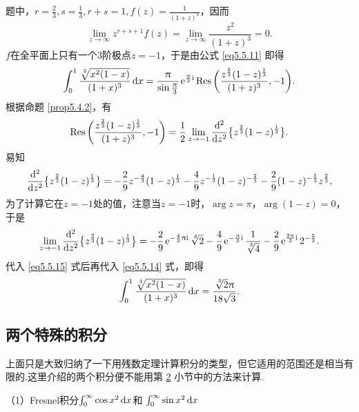 \begin{solution}
题中，$r=\frac23,s=\frac13,r+s=1,f(z)=\frac1{(1+z)^3}$，因而
\[\lim_{z\to\infty}z^{r+s+1}f(z)=\lim_{z\to\infty}\frac{z^2}{(1+z)^3}=0.\]
$f$在全平面上只有一个$3$阶极点$z=-1$，于是由公式 \eqref{eq5.5.11} 即得
\begin{equation}\label{eq5.5.14}
\int_0^1\frac{\sqrt[\leftroot{-1}\uproot{2}3]{x^2(1-x)}}{(1+x)^3}\dx
=\frac\pi{\sin\frac\pi3}\ee^{\frac\pi3\ii}\Res
\bigg(\frac{z^{\frac23}(1-z)^{\frac13}}{(1+z)^3},-1\bigg).
\end{equation}
根据命题 \ref{prop5.4.2}，有
\begin{equation}\label{eq5.5.15}
\operatorname*{Res}\bigg(\frac{z^{\frac23}(1-z)^{\frac13}}{(1+z)^3},-1\bigg)=\frac12
\lim_{z\to-1}\frac{\mathop{}\!\mathrm d^2}{\mathop{}\!\mathrm dz^2}\big\{z^{\frac23}(1-z)^{\frac13}\big\}.
\end{equation}
易知
\[\frac{\mathop{}\!\mathrm d^2}{\mathop{}\!\mathrm dz^2}\big\{z^{\frac23}(1-z)^{\frac13}\big\}=-\frac29z^{-\frac43}(1-z)^{\frac13}
-\frac49z^{-\frac13}(1-z)^{-\frac23}-\frac29(1-z)^{-\frac53}z^{\frac23},\]
为了计算它在$z=-1$处的值，注意当$z=-1$时，$\arg z=\pi$，$\arg(1-z)=0$，于是
\[\lim_{z\to-1}\ddd{}z\big\{z^{\frac23}(1-z)^{\frac13}\big\}
=-\frac29\ee^{-\frac43\pi\ii}\sqrt[\leftroot{-1}\uproot{2}3]2-
\frac49\ee^{-\frac\pi3\ii}\frac1{\sqrt[\leftroot{-1}\uproot{2}3]4}-
\frac29\ee^{\frac{2\pi}3\ii}2^{-\frac53}.\]
代入 \eqref{eq5.5.15} 式后再代入 \eqref{eq5.5.14} 式，即得
\begin{equation*}
\int_0^1\frac{\sqrt[\leftroot{-1}\uproot{2}3]{x^2(1-x)}}{(1+x)^3}\dx
=\frac{\sqrt[\leftroot{-1}\uproot{2}3]2\pi}{18\sqrt3}.
\end{equation*}
\end{solution}

\subsection{两个特殊的积分}
上面只是大致归纳了一下用残数定理计算积分的类型，但它适用的范围还是相当有限的.这里介绍的两个积分便不能用第 \hyperlink{sec5.5.2}{2} 小节中的方法来计算.

（1）{\kaishu Fresnel积分$\int_0^\infty\cos x^2\mathop{}\!\mathrm dx$和
$\int_0^\infty\sin x^2\mathop{}\!\mathrm dx$}

